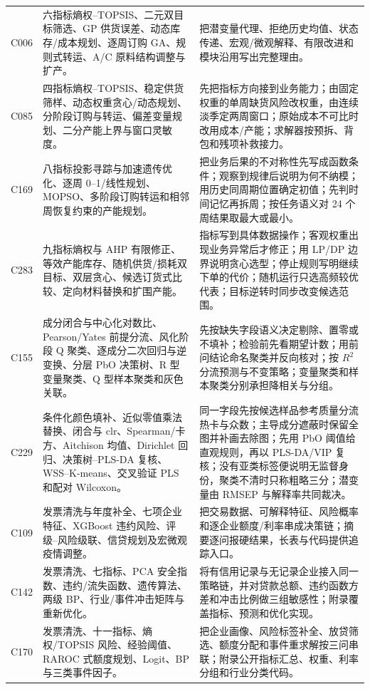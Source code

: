 \documentclass[UTF8,a4paper,12pt]{ctexart}
\begin{document}
\begin{longtable}{p{1.4cm}p{5.2cm}p{7.0cm}}
C006 & 六指标熵权--TOPSIS、二元双目标筛选、GP 供货误差、动态库存/成本规划、逐周订购 GA、规则式转运、A/C 原料结构调整与扩产。 &
把潜变量代理、拒绝历史均值、状态传递、宏观/微观解释、有限改进和模块沿用写出完整理由。\\
C085 & 四指标熵权--TOPSIS、稳定供货筛样、动态权重贪心/动态规划、分阶段订购与转运、偏差变量规划、二分产能上界与窗口灵敏度。 &
先把指标方向接到业务能力；由固定权重的单周缺货风险改权重，由连续淡季定两周窗口；原始成本不可比时改用成本/产能；求解器按预拆、背包和残项补救接力。\\
C169 & 八指标投影寻踪与加速遗传优化、逐周 0--1/线性规划、MOPSO、多阶段订购转运和相邻周恢复约束的产能规划。 &
把业务后果的不对称性先写成函数条件；观察到规律后说明为何不纳模；用历史同周期位置确定初值；先判时间记忆再拆周；按任务语义对 24 个周结果取最大或最小。\\
C283 & 九指标熵权与 AHP 有限修正、等效产能库存、随机供货/损耗双目标、双层贪心、候选订货式比较、定向材料替换和扩围产能。 &
指标写到具体数据操作；客观权重出现业务异常后才修正；用 LP/DP 边界说明贪心选型；停止规则写明继续下单的代价；随机运行只选高频较优代表；目标逆转时同步改变候选范围。\\
C155 & 成分闭合与中心化对数比、Pearson/Yates 前提分流、风化阶段 Q 聚类、逐成分二次回归与逆变换、分层 PbO 决策树、R 型变量聚类、Q 型样本聚类和灰色关联。 &
先按缺失字段语义决定剔除、置零或不填补；检验前先看期望计数；用前问结论命名聚类并反向核对；按 $R^2$ 分流预测与不变策略；变量聚类和样本聚类分别承担降相关与分组。\\
C229 & 条件化颜色填补、近似零值乘法替换、闭合与 clr、Spearman/卡方、Aitchison 均值、Dirichlet 回归、决策树--PLS-DA 复核、WSS--K-means、交叉验证 PLS 和配对 Wilcoxon。 &
同一字段先按候选样品参考质量分流热卡与众数；主导成分遮蔽时保留全图并补画去除图；先用 PbO 阈值给直观规则，再以 PLS-DA/VIP 复核；没有亚类标签便说明无监督身份，聚类不清时只称粗略三分；潜变量由 RMSEP 与解释率共同裁决。\\
C109 & 发票清洗与年度补全、七项企业特征、XGBoost 违约风险、评级--风险级联、信贷规划及宏微观疫情调整。 &
把交易数据、可解释特征、风险概率和逐企业额度/利率串成决策链；摘要逐问报硬结果，长表与代码提供追踪入口。\\
C142 & 发票清洗、七指标、PCA 安全指数、违约/流失函数、遗传算法、两级 BP、行业/事件冲击矩阵与重新优化。 &
将有信用记录与无记录企业接入同一策略链，并对贷款总额、违约函数方差和冲击比例做三组敏感性；附录覆盖指标、预测和优化实现。\\
C170 & 发票清洗、十一指标、熵权/TOPSIS 风险、经验阈值、RAROC 式额度规划、Logit、BP 与三类事件因子。 &
把企业画像、风险标签补全、放贷筛选、额度分配和事件重求解按三问串联；附录公开指标汇总、权重、利率分组和行业分类代码。\\

\end{longtable}
\end{document}
